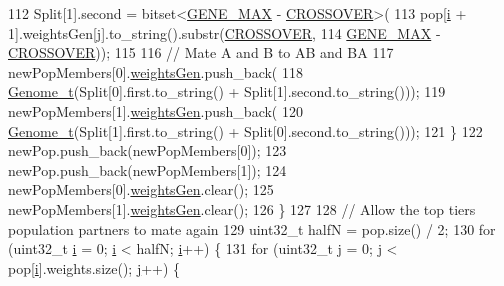 \begin{DoxyCode}
112       Split[1].second = bitset<\hyperlink{_soil_math_types_8h_aa5e1eb1a998e5ed69af2076cf318df4b}{GENE\_MAX} - \hyperlink{_soil_math_types_8h_ae84e527452fcf9dfc8ef8fd0dd5cd598}{CROSSOVER}>(
113           pop[\hyperlink{_comparision_pictures_2_createtest_image_8m_a6f6ccfcf58b31cb6412107d9d5281426}{i} + 1].weightsGen[\hyperlink{_comparision_pictures_2_createtest_image_8m_ac86694252f8dfdb19aaeadc4b7c342c6}{j}].to\_string().substr(\hyperlink{_soil_math_types_8h_ae84e527452fcf9dfc8ef8fd0dd5cd598}{CROSSOVER},
114                                                       \hyperlink{_soil_math_types_8h_aa5e1eb1a998e5ed69af2076cf318df4b}{GENE\_MAX} - 
      \hyperlink{_soil_math_types_8h_ae84e527452fcf9dfc8ef8fd0dd5cd598}{CROSSOVER}));
115 
116       \textcolor{comment}{// Mate A and B to AB and BA}
117       newPopMembers[0].\hyperlink{struct_pop_member_struct_a072fadb4863e0cf77b55ad3b46b62522}{weightsGen}.push\_back(
118           \hyperlink{_soil_math_types_8h_a58f6ab36d2cb0527a73caec36d14a0e0}{Genome\_t}(Split[0].first.to\_string() + Split[1].second.to\_string()));
119       newPopMembers[1].\hyperlink{struct_pop_member_struct_a072fadb4863e0cf77b55ad3b46b62522}{weightsGen}.push\_back(
120           \hyperlink{_soil_math_types_8h_a58f6ab36d2cb0527a73caec36d14a0e0}{Genome\_t}(Split[1].first.to\_string() + Split[0].second.to\_string()));
121     \}
122     newPop.push\_back(newPopMembers[0]);
123     newPop.push\_back(newPopMembers[1]);
124     newPopMembers[0].\hyperlink{struct_pop_member_struct_a072fadb4863e0cf77b55ad3b46b62522}{weightsGen}.clear();
125     newPopMembers[1].\hyperlink{struct_pop_member_struct_a072fadb4863e0cf77b55ad3b46b62522}{weightsGen}.clear();
126   \}
127 
128   \textcolor{comment}{// Allow the top tiers population partners to mate again}
129   uint32\_t halfN = pop.size() / 2;
130   \textcolor{keywordflow}{for} (uint32\_t \hyperlink{_comparision_pictures_2_createtest_image_8m_a6f6ccfcf58b31cb6412107d9d5281426}{i} = 0; \hyperlink{_comparision_pictures_2_createtest_image_8m_a6f6ccfcf58b31cb6412107d9d5281426}{i} < halfN; \hyperlink{_comparision_pictures_2_createtest_image_8m_a6f6ccfcf58b31cb6412107d9d5281426}{i}++) \{
131     \textcolor{keywordflow}{for} (uint32\_t \hyperlink{_comparision_pictures_2_createtest_image_8m_ac86694252f8dfdb19aaeadc4b7c342c6}{j} = 0; \hyperlink{_comparision_pictures_2_createtest_image_8m_ac86694252f8dfdb19aaeadc4b7c342c6}{j} < pop[\hyperlink{_comparision_pictures_2_createtest_image_8m_a6f6ccfcf58b31cb6412107d9d5281426}{i}].weights.size(); \hyperlink{_comparision_pictures_2_createtest_image_8m_ac86694252f8dfdb19aaeadc4b7c342c6}{j}++) \{

\end{DoxyCode}

